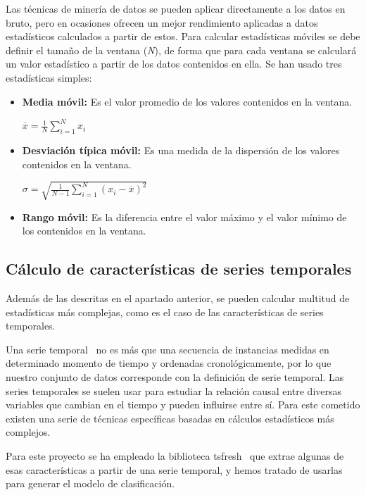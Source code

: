 Las técnicas de minería de datos se pueden aplicar directamente a los datos en bruto, pero en ocasiones ofrecen un mejor rendimiento aplicadas a datos estadísticos calculados a partir de estos. Para calcular estadísticas móviles se debe definir el tamaño de la ventana (\textit{N}), de forma que para cada ventana se calculará un valor estadístico a partir de los datos contenidos en ella. Se han usado tres estadísticas simples: 

\begin{minipage}{\linewidth}
\begin{itemize}
	\item \textbf{Media móvil:} Es el valor promedio de los valores contenidos en la ventana. 
	\begin{center}
		$ \overline{x}=\frac{1}{N}\sum_{i=1}^{N}x_{i}$
	\end{center}
	\item \textbf{Desviación típica móvil:} Es una medida de la dispersión de los valores contenidos en la ventana. 
	\begin{center}
		$ \sigma=\sqrt{\frac{1}{N-1}\sum_{i=1}^{N}(x_{i}-\overline{x})^2}$
	\end{center}
	\item \textbf{Rango móvil:} Es la diferencia entre el valor máximo y el valor mínimo de los contenidos en la ventana. 
\end{itemize}
\end{minipage}

\subsection{Cálculo de características de series temporales}

Además de las descritas en el apartado anterior, se pueden calcular multitud de estadísticas más complejas, como es el caso de las características de series temporales. 

Una serie temporal~\cite{wiki:serietemporal} no es más que una secuencia de instancias medidas en determinado momento de tiempo y ordenadas cronológicamente, por lo que nuestro conjunto de datos corresponde con la definición de serie temporal. Las series temporales se suelen usar para estudiar la relación causal entre diversas variables que cambian en el tiempo y pueden influirse entre sí. Para este cometido existen una serie de técnicas específicas basadas en cálculos estadísticos más complejos. 

Para este proyecto se ha empleado la biblioteca tsfresh~\cite{christ2018time} que extrae algunas de esas características a partir de una serie temporal, y hemos tratado de usarlas para generar el modelo de clasificación. 

